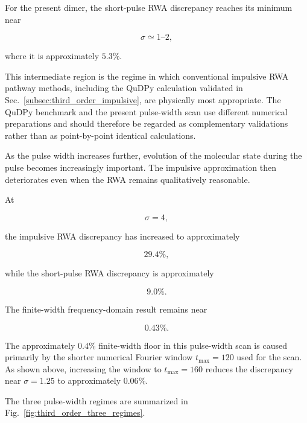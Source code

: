 \documentclass[11pt]{article}
\begin{document}
For the present dimer, the short-pulse RWA discrepancy reaches its
minimum near

\begin{equation}
\sigma
\simeq
1\text{--}2,
\end{equation}

where it is approximately $5.3\%$.

This intermediate region is the regime in which conventional
impulsive RWA pathway methods, including the QuDPy calculation
validated in Sec.~\ref{subsec:third_order_impulsive}, are physically
most appropriate.  The QuDPy benchmark and the present pulse-width scan
use different numerical preparations and should therefore be regarded
as complementary validations rather than as point-by-point identical
calculations.

As the pulse width increases further, evolution of the molecular state
during the pulse becomes increasingly important.  The impulsive
approximation then deteriorates even when the RWA remains qualitatively
reasonable.

At

\begin{equation}
\sigma=4,
\end{equation}

the impulsive RWA discrepancy has increased to approximately

\begin{equation}
29.4\%,
\end{equation}

while the short-pulse RWA discrepancy is approximately

\begin{equation}
9.0\%.
\end{equation}

The finite-width frequency-domain result remains near

\begin{equation}
0.43\%.
\end{equation}

The approximately $0.4\%$ finite-width floor in this pulse-width scan
is caused primarily by the shorter numerical Fourier window
$t_{\max}=120$ used for the scan.  As shown above, increasing the
window to $t_{\max}=160$ reduces the discrepancy near
$\sigma=1.25$ to approximately $0.06\%$.

The three pulse-width regimes are summarized in
Fig.~\ref{fig:third_order_three_regimes}.
\end{document}
